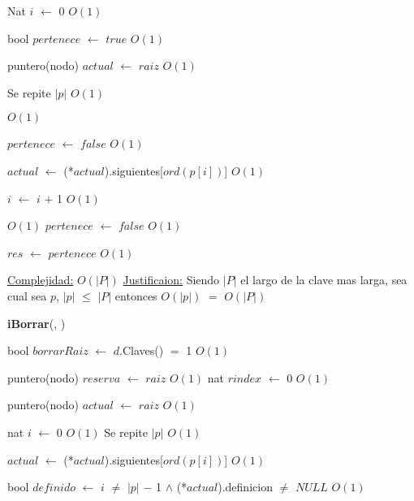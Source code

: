 \begin{Algoritmos}
\begin{algorithm}[H]
\begin{algorithmic}[1]
\State Nat $i$ $\gets$ $0$ \Comment $O(1)$

\State bool $pertenece$ $\gets$ $true$ \Comment $O(1)$

\State puntero(nodo) $actual$ $\gets$ $raiz$ \Comment $O(1)$ 

   \Comment Se repite $|p|$ $O(1)$
		
	
	 \Comment $O(1)$

		\State $pertenece$ $\gets$ $false$ \Comment $O(1)$	 
	
	\EndIf
	
	\State $actual$ $\gets$ (*$actual$).siguientes[$ord(p[i])$] \Comment $O(1)$

	\State $i$ $\gets$ $i$ $+$ 1 \Comment $O(1)$
\EndWhile 

 \Comment $O(1)$ 
	\State $pertenece$ $\gets$ $false$ \Comment $O(1)$
\EndIf

\State $res$ $\gets$ $pertenece$ \Comment $O(1)$ 

\medskip
\State \underline{Complejidad:} $O(|P|)$
\State \underline{Justificaion:} Siendo $|P|$ el largo de la clave mas larga, sea cual sea $p$, $|p|$ $\leq$ $|P|$ entonces 	$O(|p|)$ $=$ $O(|P|)$

\end{algorithmic}
\end{algorithm}



\begin{algorithm}[H]
{\textbf{iBorrar}(, })
\begin{algorithmic}[1]

\State bool $borrarRaiz$ $\gets$ $d$.Claves() $=$ 1 \Comment $O(1)$

\State puntero(nodo) $reserva$ $\gets$ $raiz$ \Comment $O(1)$ 
\State nat $rindex$ $\gets$ 0 \Comment $O(1)$

\State puntero(nodo) $actual$ $\gets$ $raiz$ \Comment $O(1)$ 

\State nat $i$ $\gets$ 0 \Comment $O(1)$
   \Comment Se repite $|p|$ $O(1)$
		
	
	
	\State $actual$ $\gets$ (*$actual$).siguientes[$ord(p[i])$] \Comment $O(1)$

	\State bool $definido$ $\gets$ $i$ $\neq$ $|p|$ $-$ 1 $\land$ (*$actual$).definicion $\neq$ $NULL$ \Comment $O(1)$


\end{algorithmic}
\end{algorithm}
\end{Algoritmos}
